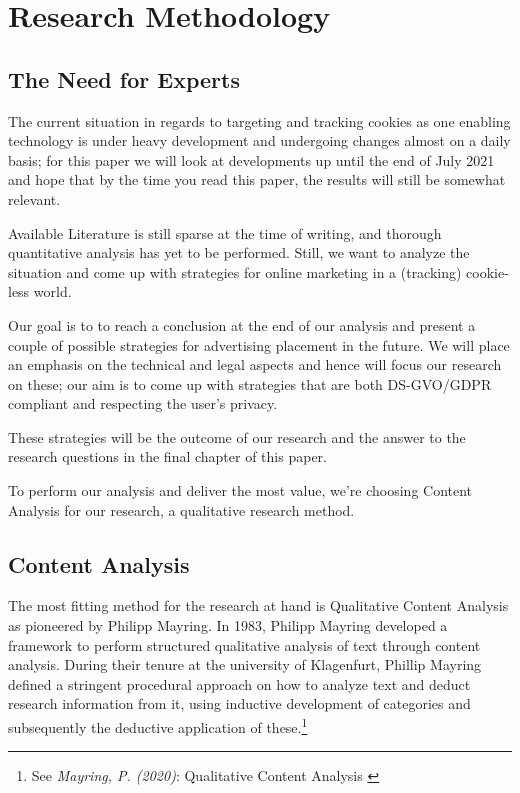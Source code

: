 %
%

\pagebreak
\section{Research Methodology}

\onehalfspacing

\subsection{The Need for Experts}

The current situation in regards to targeting and tracking cookies as one enabling technology is under heavy development and undergoing changes almost on a daily basis; for this paper we will look at developments up until the end of July 2021 and hope that by the time you read this paper, the results will still be somewhat relevant.

Available Literature is still sparse at the time of writing, and thorough quantitative analysis has yet to be performed. Still, we want to analyze the situation and come up with strategies for online marketing in a (tracking) cookie-less world.

Our goal is to to reach a conclusion at the end of our analysis and present a couple of possible strategies for advertising placement in the future. We will place an emphasis on the technical and legal aspects and hence will focus our research on these; our aim is to come up with strategies that are both DS-GVO/GDPR compliant and respecting the user's privacy.

These strategies will be the outcome of our research and the answer to the research questions in the final chapter of this paper.

To perform our analysis and deliver the most value, we're choosing Content Analysis for our research, a qualitative research method.

\subsection{Content Analysis}

The most fitting method for the research at hand is Qualitative Content Analysis as pioneered by Philipp Mayring. In 1983, Philipp Mayring developed a framework to perform structured qualitative analysis of text through content analysis. During their tenure at the university of Klagenfurt, Phillip Mayring defined a stringent procedural approach on how to analyze text and deduct research information from it, using inductive development of categories and subsequently the deductive application of these.\footnote{See \textit{Mayring, P. (2020)}: Qualitative Content Analysis \cite{qualiContent}}

